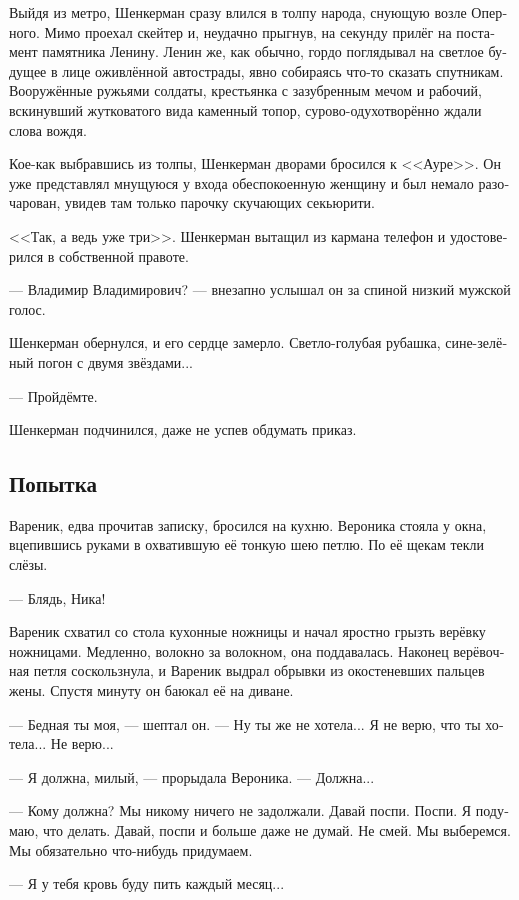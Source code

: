 \documentclass[a5paper,12pt,fleqn]{extbook}\usepackage{cooltooltips}\usepackage{polyglossia}\setdefaultlanguage[babelshorthands=true]{russian}\setotherlanguage{english}\defaultfontfeatures{Ligatures=TeX,Mapping=tex-text} \usepackage{xcolor}\definecolor{lightgray}{HTML}{bbbbbb}\color{lightgray}\newcommand{\ml}[3]{\textenglish{\textcolor{black}{#3}}}
\begin{document}
Выйдя из метро, Шенкерман сразу влился в толпу народа, снующую возле Оперного.
Мимо проехал скейтер и, неудачно прыгнув, на секунду прилёг на постамент памятника Ленину.
Ленин же, как обычно, гордо поглядывал на светлое будущее в лице оживлённой автострады, явно собираясь что-то сказать спутникам.
Вооружённые ружьями солдаты, крестьянка с зазубренным мечом и рабочий, вскинувший жутковатого вида каменный топор, сурово-одухотворённо ждали слова вождя.

Кое-как выбравшись из толпы, Шенкерман дворами бросился к <<Ауре>>.
Он уже представлял мнущуюся у входа обеспокоенную женщину и был немало разочарован, увидев там только парочку скучающих секьюрити.

<<Так, а ведь уже три>>.
Шенкерман вытащил из кармана телефон и удостоверился в собственной правоте.

--- Владимир Владимирович? --- внезапно услышал он за спиной низкий мужской голос.

Шенкерман обернулся, и его сердце замерло.
Светло-голубая рубашка, сине-зелёный погон с двумя звёздами...

--- Пройдёмте.

Шенкерман подчинился, даже не успев обдумать приказ.

\subsection{Попытка}

Вареник, едва прочитав записку, бросился на кухню.
Вероника стояла у окна, вцепившись руками в охватившую её тонкую шею петлю.
По её щекам текли слёзы.

--- Блядь, Ника!

Вареник схватил со стола кухонные ножницы и начал яростно грызть верёвку ножницами.
Медленно, волокно за волокном, она поддавалась.
Наконец верёвочная петля соскользнула, и Вареник выдрал обрывки из окостеневших пальцев жены.
Спустя минуту он баюкал её на диване.

--- Бедная ты моя, --- шептал он.
--- Ну ты же не хотела...
Я не верю, что ты хотела...
Не верю...

--- Я должна, милый, --- прорыдала Вероника.
--- Должна...

--- Кому должна?
Мы никому ничего не задолжали.
Давай поспи.
Поспи.
Я подумаю, что делать.
Давай, поспи и больше даже не думай.
Не смей.
Мы выберемся.
Мы обязательно что-нибудь придумаем.

--- Я у тебя кровь буду пить каждый месяц...
\end{document}
